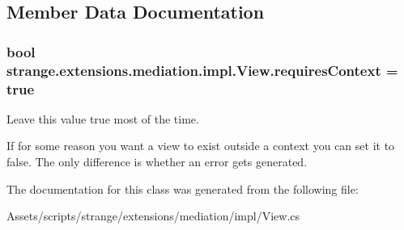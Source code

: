\subsection{Member Data Documentation}
\hypertarget{classstrange_1_1extensions_1_1mediation_1_1impl_1_1_view_ad830e5b03b04691f18ea3fe83a6b2a6d}{
\subsubsection[{requires\-Context}]{\setlength{\rightskip}{0pt plus 5cm}bool strange.\-extensions.\-mediation.\-impl.\-View.\-requires\-Context = true}}\label{classstrange_1_1extensions_1_1mediation_1_1impl_1_1_view_ad830e5b03b04691f18ea3fe83a6b2a6d}


Leave this value true most of the time. 

If for some reason you want a view to exist outside a context you can set it to false. The only difference is whether an error gets generated. 

The documentation for this class was generated from the following file\-:\begin{DoxyCompactItemize}
\item 
Assets/scripts/strange/extensions/mediation/impl/View.\-cs\end{DoxyCompactItemize}
